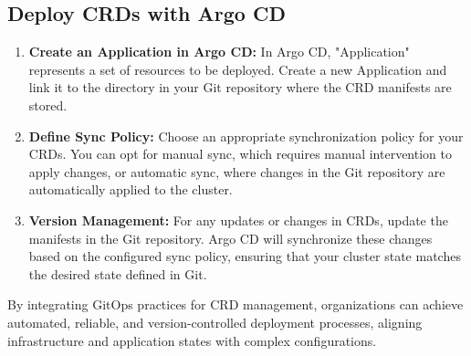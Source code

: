 \subsection{Deploy CRDs with Argo CD}

\begin{enumerate}
    \item \textbf{Create an Application in Argo CD:} In Argo CD, "Application" represents a set of resources to be deployed. Create a new Application and link it to the directory in your Git repository where the \ac{CRD} manifests are stored. 
    \item \textbf{Define Sync Policy:} Choose an appropriate synchronization policy for your \ac{CRD}s. You can opt for manual sync, which requires manual intervention to apply changes, or automatic sync, where changes in the Git repository are automatically applied to the cluster. 
    \item \textbf{Version Management:} For any updates or changes in \ac{CRD}s, update the manifests in the Git repository. Argo CD will synchronize these changes based on the configured sync policy, ensuring that your cluster state matches the desired state defined in Git. 
\end{enumerate}

By integrating GitOps practices for \ac{CRD} management, organizations can achieve automated, reliable, and version-controlled deployment processes, aligning infrastructure and application states with complex configurations.